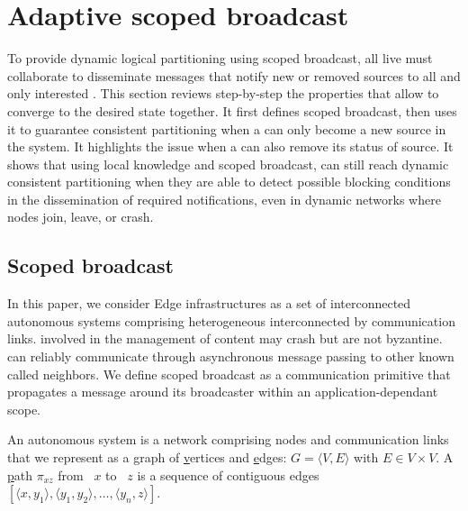\section{Adaptive scoped broadcast}
\label{sec:adaptive}

To provide dynamic logical partitioning using scoped broadcast, all
live \processes must collaborate to disseminate messages that notify
new or removed sources to all and only interested \processes. This
section reviews step-by-step the properties that allow \processes to
converge to the desired state together. It first defines scoped
broadcast, then uses it to guarantee consistent partitioning when a
\process can only become a new source in the system. It highlights the
issue when a \process can also remove its status of source. It shows
that using local knowledge and scoped broadcast, \processes can still
reach dynamic consistent partitioning when they are able to detect
possible blocking conditions in the dissemination of required
notifications, even in dynamic networks where nodes join, leave, or
crash. %

\subsection{Scoped broadcast}
\label{subsec:scoped}

In this paper, we consider Edge infrastructures as a set of
interconnected autonomous systems comprising heterogeneous \nodes
interconnected by communication links. \Processes involved in the
management of content may crash but are not byzantine.  \Processes can
reliably communicate through asynchronous message passing to other
known \processes called neighbors.  We define scoped broadcast as a
communication primitive that propagates a message around its
broadcaster within an application-dependant scope.

\begin{definition}
  An autonomous system is a network comprising nodes and communication
  links that we represent as a \underline{g}raph of
  \underline{v}ertices and \underline{e}dges:
  $G = \langle V, E \rangle$ with $E \in V \times V$. A
  \underline{p}ath $\pi_{xz}$ from \Process~$x$ to \Process~$z$ is a
  sequence of contiguous edges
  $[\langle x, y_1 \rangle, \langle y_1, y_2\rangle, \ldots, \langle
  y_n, z \rangle]$.
\end{definition}

